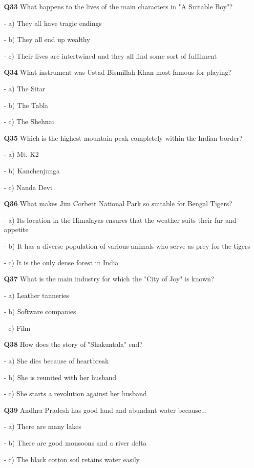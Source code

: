 \textbf{Q33} What happens to the lives of the main characters in "A Suitable Boy"?\par
\quad - a) They all have tragic endings\par
\quad - b) They all end up wealthy\par
\quad - c) Their lives are intertwined and they all find some sort of fulfilment\par

\textbf{Q34} What instrument was Ustad Bismillah Khan most famous for playing?\par
\quad - a) The Sitar\par
\quad - b) The Tabla\par
\quad - c) The Shehnai\par

\textbf{Q35} Which is the highest mountain peak completely within the Indian border?\par
\quad - a) Mt. K2\par
\quad - b) Kanchenjunga\par
\quad - c) Nanda Devi\par

\textbf{Q36} What makes Jim Corbett National Park so suitable for Bengal Tigers?\par
\quad - a) Its location in the Himalayas ensures that the weather suits their fur and appetite\par
\quad - b) It has a diverse population of various animals who serve as prey for the tigers\par
\quad - c) It is the only dense forest in India\par

\textbf{Q37} What is the main industry for which the "City of Joy" is known?\par
\quad - a) Leather tanneries\par
\quad - b) Software companies\par
\quad - c) Film\par

\textbf{Q38} How does the story of "Shakuntala" end?\par
\quad - a) She dies because of heartbreak\par
\quad - b) She is reunited with her husband\par
\quad - c) She starts a revolution against her husband\par

\textbf{Q39} Andhra Pradesh has good land and abundant water because...\par
\quad - a) There are many lakes\par
\quad - b) There are good monsoons and a river delta\par
\quad - c) The black cotton soil retains water easily\par

